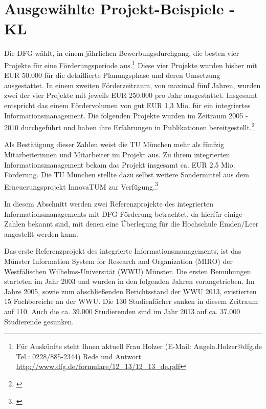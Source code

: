 
\section{Ausgewählte Projekt-Beispiele - KL}

\label{section_projekt_beispiele}
Die DFG wählt, in einem jährlichen Bewerbungsdurchgang, die besten vier Projekte für eine Förderungsperiode aus.\footnote{Für Auskünfte steht Ihnen aktuell Frau Holzer (E-Mail: Angela.Holzer@dfg.de Tel.: 0228/885-2344) Rede und Antwort \url{http://www.dfg.de/formulare/12_13/12_13_de.pdf}} Diese vier Projekte wurden bisher mit EUR 50.000 für die detaillierte Planungsphase und deren Umsetzung ausgestattet. In einem zweiten Förderzeitraum, von maximal fünf Jahren, wurden zwei der vier Projekte mit jeweils EUR 250.000 pro Jahr ausgestattet.
Insgesamt entspricht das einem Fördervolumen von gut EUR 1,3 Mio. für ein integriertes Informationsmanagement.
Die folgenden Projekte wurden im Zeitraum 2005 - 2010 durchgeführt und haben ihre Erfahrungen in Publikationen bereitgestellt.\footnote{\cite{kerres_hochschulen_2005}}

Als Bestätigung dieser Zahlen weist die TU München mehr als fünfzig Mitarbeiterinnen und Mitarbeiter im Projekt aus. Zu ihrem integrierten Informationsmanagement bekam das Projekt insgesamt ca. EUR 2,5 Mio. Förderung. Die TU München stellte dazu selbst weitere Sondermittel aus dem Erneuerungsprojekt InnovaTUM zur Verfügung.\footnote{\cite{bode_informationsmanagement_2010}}

In diesem Abschnitt werden zwei Referenzprojekte des integrierten Informationsmanagements mit DFG Förderung betrachtet, da hierfür einige Zahlen bekannt sind, mit denen eine Überlegung für die Hochschule Emden/Leer angestellt werden kann.


Das erste Referenzprojekt des integrierte Informationsmanagements, ist das Münster Information System for Research and Organization (MIRO) der Westfälischen Wilhelms-Universität (WWU) Münster. Die ersten Bemühungen starteten im Jahr 2003 und wurden in den folgenden Jahren vorangetrieben. Im Jahre 2005, sowie zum abschließenden Berichtsstand der WWU 2013, existierten 15 Fachbereiche an der WWU. Die 130 Studienfächer sanken in diesem Zeitraum auf 110. Auch die ca. 39.000 Studierenden sind im Jahr 2013 auf ca. 37.000 Studierende gesunken.

